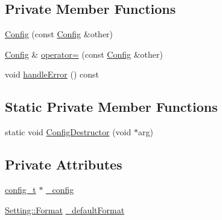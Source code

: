 \subsection*{Private Member Functions}
\begin{DoxyCompactItemize}
\item 
\hyperlink{classlibconfig_1_1Config_a7e2e4843b6561585c3e311b4496d06db}{Config} (const \hyperlink{classlibconfig_1_1Config}{Config} \&other)
\item 
\hyperlink{classlibconfig_1_1Config}{Config} \& \hyperlink{classlibconfig_1_1Config_ae32db24df7cb17580291a97490714b95}{operator=} (const \hyperlink{classlibconfig_1_1Config}{Config} \&other)
\item 
void \hyperlink{classlibconfig_1_1Config_a1f6fe8feb7183108cf4914b3b428e7d7}{handle\-Error} () const 
\end{DoxyCompactItemize}
\subsection*{Static Private Member Functions}
\begin{DoxyCompactItemize}
\item 
static void \hyperlink{classlibconfig_1_1Config_a98c0d6314e24643057eea62e3ae407de}{Config\-Destructor} (void $\ast$arg)
\end{DoxyCompactItemize}
\subsection*{Private Attributes}
\begin{DoxyCompactItemize}
\item 
\hyperlink{structconfig__t}{config\-\_\-t} $\ast$ \hyperlink{classlibconfig_1_1Config_ac8440fe53e4bd0f1f9663d99e5c63322}{\-\_\-config}
\item 
\hyperlink{classlibconfig_1_1Setting_a35034c3fd8c1b2e8e590b6f53083106e}{Setting\-::\-Format} \hyperlink{classlibconfig_1_1Config_a6fdc2ad386a58b7d8715db0453658bb6}{\-\_\-default\-Format}
\end{DoxyCompactItemize}


